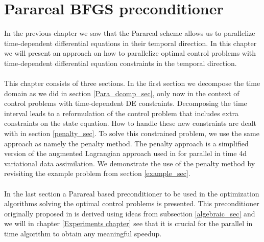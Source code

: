\chapter{Parareal BFGS preconditioner} \label{method_chap}
In the previous chapter we saw that the Parareal scheme allows us to parallelize time-dependent differential equations in their temporal direction. In this chapter we will present an approach on how to parallelize optimal control problems with time-dependent differential equation constraints in the temporal direction. 
\\
\\
This chapter consists of three sections. In the first section we decompose the time domain as we did in section \ref{Para_dcomp_sec}, only now in the context of control problems with time-dependent DE constraints. Decomposing the time interval leads to a reformulation of the control problem that includes extra constraints on the state equation. How to handle these new constraints are dealt with in section \ref{penalty_sec}. To solve this constrained problem, we use the same approach as \cite{maday2002parareal} namely the penalty method. The penalty approach is a simplified version of the augmented Lagrangian approach used in \cite{rao2016time} for parallel in time 4d variational data assimilation. We demonstrate the use of the penalty method by revisiting the example problem from section \ref{example_sec}.
\\
\\
In the last section a Parareal based preconditioner to be used in the optimization algorithms solving the optimal control problems is presented. This preconditioner originally proposed in \cite{maday2002parareal} is derived using ideas from subsection \ref{algebraic_sec} and we will in chapter \ref{Experiments chapter} see that it is crucial for the parallel in time algorithm to obtain any meaningful speedup. 
